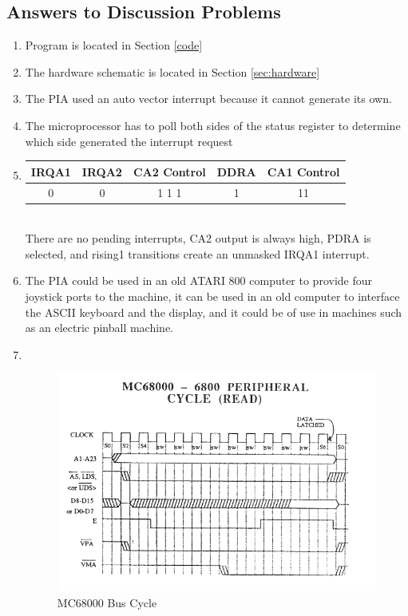 \documentclass[12pt,Letter]{article}
\begin{document}
\subsection{Answers to Discussion Problems}
\begin{enumerate}
	\item Program is located in Section \ref{code}
	\item The hardware schematic is located in Section \ref{sec:hardware}
	\item The PIA used an auto vector interrupt because it cannot generate its own.
	\item The microprocessor has to poll both sides of the status register to determine which side generated the interrupt request
	\item \begin{tabular}{|c|c|c|c|c|}
		\hline 
			IRQA1 & IRQA2 & CA2 Control & DDRA & CA1 Control \\ \hline
			0 & 0 & 1 1 1 & 1 & 11 \\ \hline
	\end{tabular}
	
	~\\
	There are no pending interrupts, CA2 output is always high, PDRA is selected, and rising1 transitions create an unmasked IRQA1 interrupt.
	\item The PIA could be used in an old ATARI 800 computer to provide four joystick ports to the machine, it can be used in an old computer to interface the ASCII keyboard and the display, and it could be of use in machines such as an electric pinball machine.  
	\item ~\\
	
\begin{figure}[H]
\centering
\includegraphics[width=1\linewidth]{bus}
\caption{MC68000 Bus Cycle}
\label{fig:bus}
\end{figure}
\end{enumerate}
\end{document}
